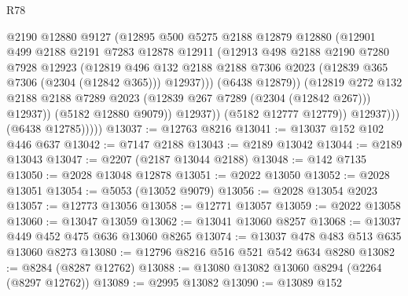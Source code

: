 \begin{lexlean}{R78}
\begin{coremodule}
                            @2190
                            @12880
                            @9127
                            (@12895
                              @500
                              @5275
                              @2188
                              @12879
                              @12880
                              (@12901
                                @499
                                @2188
                                @2191
                                @7283
                                @12878
                                @12911
                                (@12913
                                  @498
                                  @2188
                                  @2190
                                  @7280
                                  @7928
                                  @12923
                                  (@12819
                                    @496
                                    @132
                                    @2188
                                    @2188
                                    @7306
                                    @2023
                                    (@12839 @365 @7306 (@2304 (@12842 @365)))
                                    @12937)))
                              (@6438 @12879))
                            (@12819
                              @272
                              @132
                              @2188
                              @2188
                              @7289
                              @2023
                              (@12839 @267 @7289 (@2304 (@12842 @267)))
                              @12937))
                          (@5182 @12880 @9079))
                        @12937))
                    (@5182 @12777 @12779))
                  @12937)))
            (@6438 @12785)))))
@13037 := @12763 @8216
@13041 := @13037 @152 @102 @446 @637
@13042 := @7147 @2188
@13043 := @2189 @13042
@13044 := @2189 @13043
@13047 := @2207 (@2187 @13044 @2188)
@13048 := @142 @7135
@13050 := @2028 @13048 @12878
@13051 := @2022 @13050
@13052 := @2028 @13051
@13054 := @5053 (@13052 @9079)
@13056 := @2028 @13054 @2023
@13057 := @12773 @13056
@13058 := @12771 @13057
@13059 := @2022 @13058
@13060 := @13047 @13059
@13062 := @13041 @13060 @8257
@13068 := @13037 @449 @452 @475 @636 @13060 @8265
@13074 := @13037 @478 @483 @513 @635 @13060 @8273
@13080 := @12796 @8216 @516 @521 @542 @634 @8280
@13082 := @8284 (@8287 @12762)
@13088 := @13080 @13082 @13060 @8294 (@2264 (@8297 @12762))
@13089 := @2995 @13082
@13090 := @13089 @152

\end{coremodule}
\end{lexlean}
